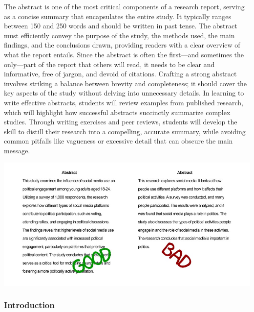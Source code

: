 \documentclass[
]{book}
\begin{document}
The abstract is one of the most critical components of a research report, serving as a concise summary that encapsulates the entire study. It typically ranges between 150 and 250 words and should be written in past tense. The abstract must efficiently convey the purpose of the study, the methods used, the main findings, and the conclusions drawn, providing readers with a clear overview of what the report entails. Since the abstract is often the first---and sometimes the only---part of the report that others will read, it needs to be clear and informative, free of jargon, and devoid of citations. Crafting a strong abstract involves striking a balance between brevity and completeness; it should cover the key aspects of the study without delving into unnecessary details. In learning to write effective abstracts, students will review examples from published research, which will highlight how successful abstracts succinctly summarize complex studies. Through writing exercises and peer reviews, students will develop the skill to distill their research into a compelling, accurate summary, while avoiding common pitfalls like vagueness or excessive detail that can obscure the main message.

\includegraphics[width=1\textwidth,height=\textheight]{images/fig081.jpg}

\subsubsection*{Introduction}\label{introduction}
\end{document}

